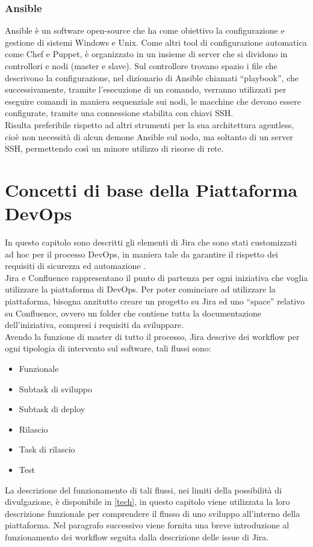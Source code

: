 \documentclass[a4paper, 12pt]{report}
\numberwithin{equation}{section}
\begin{document}
\subsection{Ansible}
Ansible è un software open-source che ha come obiettivo la configurazione e gestione di sistemi Windows e Unix. 
Come altri tool di configurazione automatica come Chef e Puppet, è organizzato in un insieme di server che si dividono in controllori e nodi (master e slave). Sul controllore trovano spazio i file che descrivono la configurazione, nel dizionario di Ansible chiamati “playbook”, che successivamente, tramite l’esecuzione di un comando, verranno utilizzati per eseguire comandi in maniera sequenziale sui nodi, le macchine che devono essere configurate, tramite una connessione stabilita con chiavi SSH.\\
Risulta preferibile rispetto ad altri strumenti per la sua architettura agentless, cioè non necessità di alcun demone Ansible sul nodo, ma soltanto di un server SSH, permettendo così un minore utilizzo di risorse di rete.


\chapter{Concetti di base della Piattaforma DevOps}\label{concetti-devops}
In questo capitolo sono descritti gli elementi di Jira che sono stati customizzati ad hoc per il processo DevOps, in maniera tale da garantire il rispetto dei requisiti di sicurezza ed automazione .\\
Jira e Confluence rappresentano il punto di partenza per ogni iniziativa che voglia utilizzare la piattaforma di DevOps. Per poter cominciare ad utilizzare la piattaforma, bisogna anzitutto creare un progetto su Jira ed uno “space” relativo su Confluence, ovvero un folder che contiene tutta la documentazione dell'iniziativa, compresi i requisiti da sviluppare.\\
Avendo la funzione di master di tutto il processo, Jira descrive dei workflow per ogni tipologia di intervento sul software, tali flussi sono:
\begin{itemize}
    \item Funzionale
    \item Subtask di sviluppo
    \item Subtask di deploy
    \item Rilascio
    \item Task di rilascio
    \item Test
\end{itemize}
La descrizione del funzionamento di tali flussi, nei limiti della possibilità di divulgazione, è disponibile in \ref{tech}, in questo capitolo viene utilizzata la loro descrizione funzionale per comprendere il flusso di uno sviluppo all’interno della piattaforma. Nel paragrafo successivo viene fornita una breve introduzione al funzionamento dei workflow seguita dalla descrizione delle issue di Jira.
\end{document}

